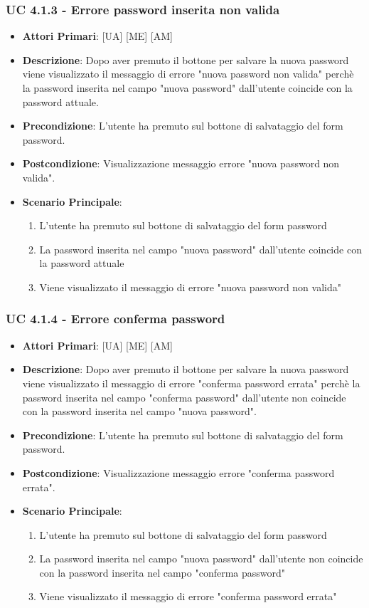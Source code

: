 			\subsubsection{UC 4.1.3 - Errore password inserita non valida}
			\begin{itemize}
				\item \textbf{Attori Primari}: [UA] [ME] [AM]
				\item \textbf{Descrizione}: Dopo aver premuto il bottone per salvare la nuova password viene visualizzato il messaggio di errore "nuova password non valida" perchè la password inserita nel campo "nuova password" dall'utente coincide con la password attuale.
				\item \textbf{Precondizione}: L'utente ha premuto sul bottone di salvataggio del form password.
				\item \textbf{Postcondizione}: Visualizzazione messaggio errore "nuova password non valida".
				\item \textbf{Scenario Principale}:
				\begin{enumerate}
					\item{L'utente ha premuto sul bottone di salvataggio del form password}
					\item{La password inserita nel campo "nuova password" dall'utente coincide con la password attuale}
					\item{Viene visualizzato il messaggio di errore "nuova password non valida"}
				\end{enumerate}
			\end{itemize}

			\subsubsection{UC 4.1.4 - Errore conferma password}
			\begin{itemize}
				\item \textbf{Attori Primari}: [UA] [ME] [AM]
				\item \textbf{Descrizione}: Dopo aver premuto il bottone per salvare la nuova password viene visualizzato il messaggio di errore "conferma password errata" perchè la password inserita nel campo "conferma password" dall'utente non coincide con la password inserita nel campo "nuova password".
				\item \textbf{Precondizione}: L'utente ha premuto sul bottone di salvataggio del form password.
				\item \textbf{Postcondizione}: Visualizzazione messaggio errore "conferma password errata".
				\item \textbf{Scenario Principale}:
				\begin{enumerate}
					\item{L'utente ha premuto sul bottone di salvataggio del form password}
					\item{La password inserita nel campo "nuova password" dall'utente non coincide con la password inserita nel campo "conferma password"}
					\item{Viene visualizzato il messaggio di errore "conferma password errata"}
				\end{enumerate}
			\end{itemize}
			
